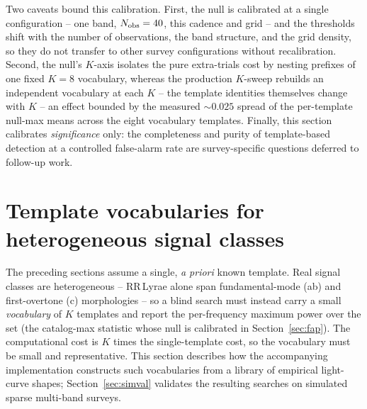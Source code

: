\documentclass[apj]{emulateapj}
\begin{document}
Two caveats bound this calibration.  First, the null is calibrated at a
single configuration -- one band, $N_{\rm obs}=40$, this cadence and grid --
and the thresholds shift with the number of observations, the band
structure, and the grid density, so they do not transfer to other survey
configurations without recalibration.  Second,
the null's $K$-axis isolates the pure extra-trials cost by nesting prefixes
of one fixed $K{=}8$ vocabulary, whereas the production $K$-sweep rebuilds an
independent vocabulary at each $K$ -- the template identities themselves
change with $K$ -- an effect bounded by the measured ${\sim}0.025$ spread of
the per-template null-max means across the eight vocabulary templates.
Finally, this section calibrates \emph{significance} only: the completeness
and purity of template-based detection at a controlled false-alarm rate are
survey-specific questions deferred to follow-up work.


\section{Template vocabularies for heterogeneous signal classes}
\label{sec:vocab}

The preceding sections assume a single, \emph{a priori} known template.
Real signal classes are heterogeneous -- RR\,Lyrae alone span
fundamental-mode (ab) and first-overtone (c) morphologies -- so a blind
search must instead carry a small \emph{vocabulary} of $K$ templates and
report the per-frequency maximum power over the set (the catalog-max
statistic whose null is calibrated in Section~\ref{sec:fap}).  The
computational cost is $K$ times the single-template cost, so the
vocabulary must be small and representative.  This section describes how
the accompanying implementation constructs such vocabularies from a
library of empirical light-curve shapes; Section~\ref{sec:simval}
validates the resulting searches on simulated sparse multi-band surveys.
\end{document}

